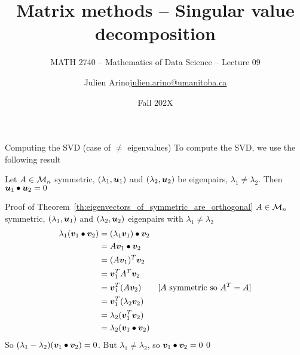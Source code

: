 \documentclass[aspectratio=169]{beamer}\usepackage[]{graphicx}\usepackage[]{xcolor}
\subtitle{MATH 2740 -- Mathematics of Data Science -- Lecture 09}
\author{\texorpdfstring{Julien Arino\newline\url{julien.arino@umanitoba.ca}}{Julien Arino}}
\institute{Department of Mathematics @ University of Manitoba}
\date{Fall 202X}
\title{Matrix methods -- Singular value decomposition}
\begin{document}
\setcounter{theorem}{75} 





\begin{frame}{Computing the SVD (case of $\neq$ eigenvalues)}
To compute the SVD, we use the following result
\vfill
\begin{theorem}\label{th:eigenvectors_of_symmetric_are_orthogonal}
Let $A\in\mathcal{M}_n$ symmetric, $(\lambda_1,\bm{u}_1)$ and $(\lambda_2,\bm{u}_2)$ be eigenpairs, $\lambda_1\neq\lambda_2$. Then $\bm{u}_1\bullet\bm{u}_2=0$
\end{theorem}
\end{frame}

\begin{frame}[red]{Proof of Theorem~\ref{th:eigenvectors_of_symmetric_are_orthogonal}}
$A\in\mathcal{M}_n$ symmetric, $(\lambda_1,\bm{u}_1)$ and $(\lambda_2,\bm{u}_2)$ eigenpairs with $\lambda_1\neq\lambda_2$
\begin{align*}
\lambda_1(\bm{v}_1\bullet\bm{v}_2) 
&= (\lambda_1\bm{v}_1)\bullet\bm{v}_2 \\
&= A\bm{v}_1\bullet\bm{v}_2 \\
&= (A\bm{v}_1)^T\bm{v}_2 \\
&= \bm{v}_1^TA^T\bm{v}_2 \\
&= \bm{v}_1^T(A\bm{v}_2)  \qquad\textrm{[$A$ symmetric so $A^T=A$]} \\
&= \bm{v}_1^T(\lambda_2\bm{v}_2) \\
&= \lambda_2(\bm{v}_1^T\bm{v}_2) \\
&= \lambda_2(\bm{v}_1\bullet\bm{v}_2)
\end{align*}
\vfill
So $(\lambda_1-\lambda_2)(\bm{v}_1\bullet\bm{v}_2)=0$. But $\lambda_1\neq\lambda_2$, so $\bm{v}_1\bullet\bm{v}_2=0$\hfill\qed
\end{frame}
\end{document}

